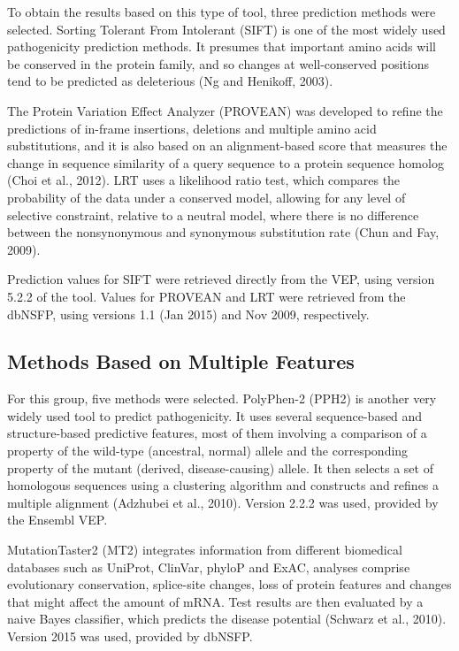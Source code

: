 \documentclass[12pt,MSc,wordcount,anon]{muthesis}
\begin{document}
\begin{flushleft}
To obtain the results based on this type of tool, three prediction methods were selected. Sorting Tolerant From Intolerant (SIFT) is one of the most widely used pathogenicity prediction methods. It presumes that important amino acids will be conserved in the protein family, and so changes at well-conserved positions tend to be predicted as deleterious (Ng and Henikoff, 2003).

The Protein Variation Effect Analyzer (PROVEAN) was developed to refine the predictions of in-frame insertions, deletions and multiple amino acid substitutions, and it is also based on an alignment-based score that measures the change in sequence similarity of a query sequence to a protein sequence homolog (Choi et al., 2012).
LRT uses a likelihood ratio test, which compares the probability of the data under a conserved model, allowing for any level of selective constraint, relative to a neutral model, where there is no difference between the nonsynonymous and synonymous substitution rate (Chun and Fay, 2009).

Prediction values for SIFT were retrieved directly from the VEP, using version 5.2.2 of the tool. Values for PROVEAN and LRT were retrieved from the dbNSFP, using versions 1.1 (Jan 2015) and Nov 2009, respectively.

\subsection{Methods Based on Multiple Features}

For this group, five methods were selected. PolyPhen-2 (PPH2) is another very widely used tool to predict pathogenicity. It uses several sequence-based and structure-based predictive features, most of them involving a comparison of a property of the wild-type (ancestral, normal) allele and the corresponding property of the mutant (derived, disease-causing) allele. It then selects a set of homologous sequences using a clustering algorithm and constructs and refines a multiple alignment (Adzhubei et al., 2010). Version 2.2.2 was used, provided by the Ensembl VEP.

MutationTaster2 (MT2) integrates information from different biomedical databases such as UniProt, ClinVar, phyloP and ExAC, analyses comprise evolutionary conservation, splice-site changes, loss of protein features and changes that might affect the amount of mRNA. Test results are then evaluated by a naive Bayes classifier, which predicts the disease potential (Schwarz et al., 2010). Version 2015 was used, provided by dbNSFP.


\end{flushleft}
\end{document}
